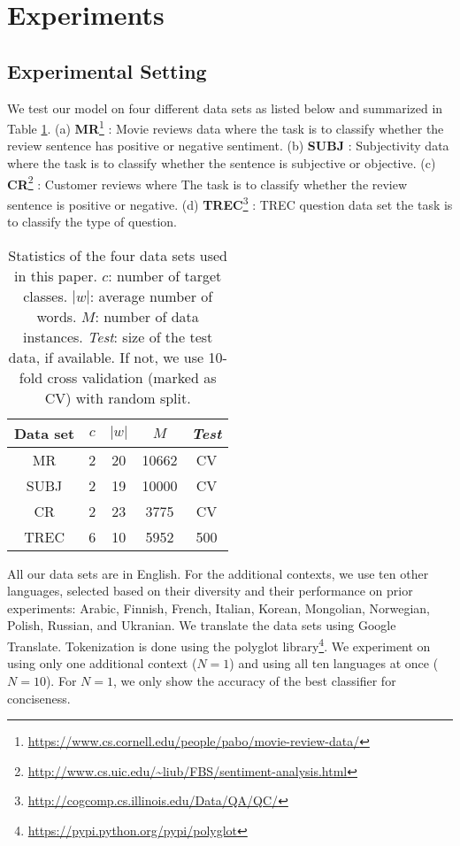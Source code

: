 \documentclass{article}
\begin{document}
\section{Experiments}



\subsection{Experimental Setting}

We test our model on four different data sets as listed below and summarized
in Table \ref{tab:data}.
(a) \textbf{MR}\footnote{\url{https://www.cs.cornell.edu/people/pabo/movie-review-data/}} \cite{pang2005seeing}: 
Movie reviews data where the task is to classify whether the review sentence has positive or negative sentiment.
(b) \textbf{SUBJ} \cite{pang2004sentimental}: Subjectivity data where the task is to classify whether the sentence is subjective or objective.
(c) \textbf{CR}\footnote{\url{http://www.cs.uic.edu/~liub/FBS/sentiment-analysis.html}} \cite{hu2004mining}: Customer reviews where
The task is to classify whether the review sentence is positive or negative.
(d) \textbf{TREC}\footnote{\url{http://cogcomp.cs.illinois.edu/Data/QA/QC/}} \cite{li2002learning}: TREC question data set 
the task is to classify the type of question.


\begin{table}[!t]
	\scriptsize
  \centering
    \begin{tabular}{|c|c|c|c|c|}
    \hline
    \textbf{Data set} & $c$ & $|w|$ & $M$  & \textit{Test} \\
    \hline
    MR    & 2     & 20    & 10662 & CV \\
    SUBJ  & 2     & 19    & 10000 & CV \\
    CR    & 2     & 23    & 3775  & CV \\
    TREC  & 6     & 10    & 5952  & 500 \\
    \hline
    \end{tabular}\caption{Statistics of the four data sets used in this paper. $c$: number of target classes. $|w|$: average number of words. $M$: number of data instances. \textit{Test}: size of the test data, if available. If not, we use 10-fold cross validation (marked as CV) with random split.}
  \label{tab:data}\end{table}

All our data sets are in English. For the additional contexts, we use ten other languages, selected based on their diversity and their performance on prior experiments: Arabic, Finnish, French, Italian, Korean, Mongolian, Norwegian, Polish, Russian, and Ukranian. We translate the data sets using Google Translate. Tokenization is done using the polyglot library\footnote{\url{https://pypi.python.org/pypi/polyglot}}. We experiment on using only one additional context ($N=1$) and using all ten languages at once ($N=10$). For $N=1$, we only show the accuracy of the best classifier for conciseness.
\end{document}
